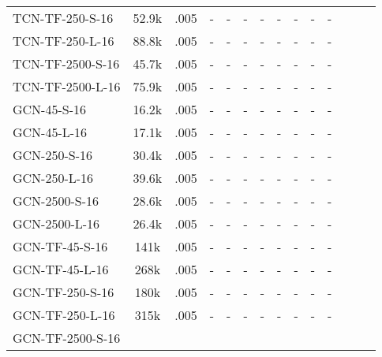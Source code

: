 \begin{table*}[h]
\begin{tabular}{lccccccccccccc}
        TCN-TF-250-S-16               
            & 52.9k & .005 & - & - & - & - & - & - & - & - \\
        TCN-TF-250-L-16               
            & 88.8k & .005 & - & - & - & - & - & - & - & - \\
        TCN-TF-2500-S-16               
            & 45.7k & .005 & - & - & - & - & - & - & - & - \\
        TCN-TF-2500-L-16               
            & 75.9k & .005 & - & - & - & - & - & - & - & - \\
        \midrule
        GCN-45-S-16               
            & 16.2k & .005 & - & - & - & - & - & - & - & - \\ 
        GCN-45-L-16               
            & 17.1k & .005 & - & - & - & - & - & - & - & - \\
        GCN-250-S-16               
            & 30.4k & .005 & - & - & - & - & - & - & - & - \\ 
        GCN-250-L-16               
            & 39.6k & .005 & - & - & - & - & - & - & - & - \\
        GCN-2500-S-16               
            & 28.6k & .005 & - & - & - & - & - & - & - & - \\ 
        GCN-2500-L-16               
            & 26.4k & .005 & - & - & - & - & - & - & - & - \\
        \midrule
        GCN-TF-45-S-16               
            & 141k & .005 & - & - & - & - & - & - & - & - \\
        GCN-TF-45-L-16               
            & 268k & .005 & - & - & - & - & - & - & - & - \\
        GCN-TF-250-S-16               
            & 180k & .005 & - & - & - & - & - & - & - & - \\
        GCN-TF-250-L-16               
            & 315k & .005 & - & - & - & - & - & -& - & -  \\
        GCN-TF-2500-S-16               

\end{tabular}
\end{table*}
